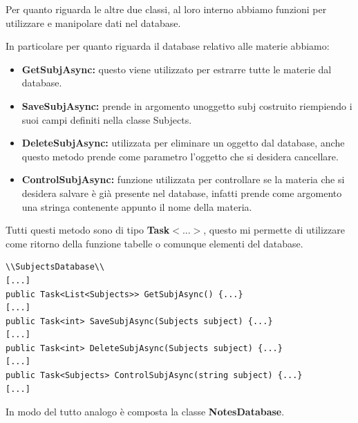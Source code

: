 \documentclass[a4paper, 50pt, twoside]{article}
\begin{document}
Per quanto riguarda le altre due classi, al loro interno abbiamo funzioni per utilizzare e manipolare dati nel database.

In particolare per quanto riguarda il database relativo alle materie abbiamo:
\begin{itemize}
\item \textbf{GetSubjAsync:} questo viene utilizzato per estrarre tutte le materie dal database.
\item \textbf{SaveSubjAsync:} prende in argomento unoggetto subj costruito riempiendo i suoi campi definiti nella classe Subjects.
\item \textbf{DeleteSubjAsync:} utilizzata per eliminare un oggetto dal database, anche questo metodo prende come parametro l'oggetto che si desidera cancellare.
\item \textbf{ControlSubjAsync:} funzione utilizzata per controllare se la materia che si desidera salvare è già presente nel database, infatti prende come argomento una stringa contenente appunto il nome della materia.
\end{itemize}

Tutti questi metodo sono di tipo \textbf{Task$<...>$}, questo mi permette di utilizzare come ritorno della funzione tabelle o comunque elementi del database.

\begin{lstlisting}
\\SubjectsDatabase\\
[...]
public Task<List<Subjects>> GetSubjAsync() {...}
[...]
public Task<int> SaveSubjAsync(Subjects subject) {...}
[...]
public Task<int> DeleteSubjAsync(Subjects subject) {...}
[...]
public Task<Subjects> ControlSubjAsync(string subject) {...}
[...]
\end{lstlisting}

In modo del tutto analogo è composta la classe \textbf{NotesDatabase}.
\end{document}
